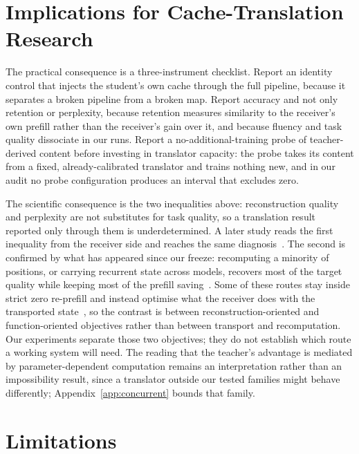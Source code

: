 \documentclass{article} %
\begin{document}

\section{Implications for Cache-Translation Research}
\label{sec:implications}

The practical consequence is a three-instrument checklist. Report an identity
control that injects the student's own cache through the full pipeline, because
it separates a broken pipeline from a broken map. Report accuracy and not only
retention or perplexity, because retention measures similarity to the receiver's
own prefill rather than the receiver's gain over it, and because fluency and
task quality dissociate in our runs. Report a no-additional-training probe of
teacher-derived content before investing in translator capacity: the probe takes
its content from a fixed, already-calibrated translator and trains nothing new,
and in our audit no probe configuration produces an interval that excludes zero.

The scientific consequence is the two inequalities above: reconstruction quality
and perplexity are not substitutes for task quality, so a translation result
reported only through them is underdetermined. A later study reads the first
inequality from the receiver side and reaches the same
diagnosis~\citep{cachelink2026}. The second is confirmed by what has appeared
since our freeze: recomputing a minority of positions, or carrying recurrent
state across models, recovers most of the target quality while keeping most of
the prefill saving~\citep{raracache2026,acct2026,latentport2026}. Some of these
routes stay inside strict zero re-prefill and instead optimise what the receiver
does with the transported state~\citep{cachelink2026,kvlingo2026}, so the
contrast is between reconstruction-oriented and function-oriented objectives
rather than between transport and recomputation. Our experiments separate those
two objectives; they do not establish which route a working system will need.
The reading that the teacher's advantage is mediated by
parameter-dependent computation remains an interpretation rather than an
impossibility result, since a translator outside our tested families might
behave differently; Appendix~\ref{app:concurrent} bounds that family.


\section{Limitations}
\label{sec:limitations}
\end{document}
